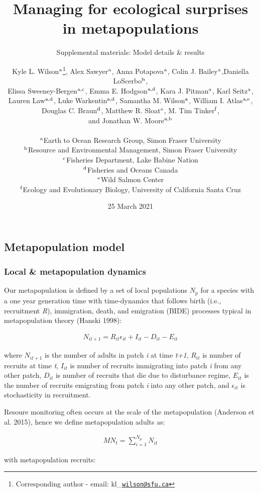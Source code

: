 \documentclass[
]{article}
\title{Managing for ecological surprises in metapopulations}
\subtitle{Supplemental materials: Model details \& results}
\author{Kyle L. Wilson\(^\textup{a}\)\footnote{Corresponding author -
  email: kl\_\href{mailto:wilson@sfu.ca}{\nolinkurl{wilson@sfu.ca}}},
Alex Sawyer\(^\textup{a}\), Anna Potapova\(^\textup{a}\), Colin J.
Bailey\(^\textup{a}\),Daniella LoScerbo\(^\textup{b}\),\\
Elissa Sweeney-Bergen\(^\textup{a,c}\), Emma E.
Hodgson\(^\textup{a,d}\), Kara J. Pitman\(^\textup{a}\), Karl
Seitz\(^\textup{a}\),\\
Lauren Law\(^\textup{a,d}\), Luke Warkentin\(^\textup{a,d}\), Samantha
M. Wilson\(^\textup{a}\), William I. Atlas\(^\textup{a,e}\),\\
Douglas C. Braun\(^\textup{d}\), Matthew R. Sloat\(^\textup{e}\), M. Tim
Tinker\(^\textup{f}\),\\
and Jonathan W. Moore\(^\textup{a,b}\)\\
~\\
\(^\textup{a}\)Earth to Ocean Research Group, Simon Fraser University\\
\(^\textup{b}\)Resource and Environmental Management, Simon Fraser
University\\
\(^\textup{c}\)Fisheries Department, Lake Babine Nation\\
\(^\textup{d}\)Fisheries and Oceans Canada\\
\(^\textup{e}\)Wild Salmon Center\\
\(^\textup{f}\)Ecology and Evolutionary Biology, University of
California Santa Cruz}
\date{25 March 2021}
\begin{document}
\maketitle

\centering
\raggedright
\renewcommand{\baselinestretch}{1}\normalsize
\tableofcontents
\renewcommand{\baselinestretch}{0.75}\normalsize
\newpage

\pagestyle{fancy}

\hypertarget{metapopulation-model}{%
\subsection{Metapopulation model}\label{metapopulation-model}}

\hypertarget{local-metapopulation-dynamics}{%
\subsubsection{Local \& metapopulation
dynamics}\label{local-metapopulation-dynamics}}

Our metapopulation is defined by a set of local populations \(N_p\) for
a species with a one year generation time with time-dynamics that
follows birth (i.e., recruitment \emph{R}), immigration, death, and
emigration (BIDE) processes typical in metapopulation theory (Hanski
1998):

\begin{align}
N_{i{t+1}}= R_{it}\epsilon_{it}+I_{it}-D_{it}-E_{it}
\end{align}

where \(N_{it+1}\) is the number of adults in patch \emph{i} at time
\emph{t+1}, \(R_{it}\) is number of recruits at time \emph{t},
\(I_{it}\) is number of recruits immigrating into patch \emph{i} from
any other patch, \(D_{it}\) is number of recruits that die due to
disturbance regime, \(E_{it}\) is the number of recruits emigrating from
patch \emph{i} into any other patch, and \(\epsilon_{it}\) is
stochasticity in recruitment.

Resoure monitoring often occurs at the scale of the metapopulation
(Anderson et al. 2015), hence we define metapopulation adults as:

\begin{align}
{MN}_t = \sum_{i=1}^{N_p} N_{it}
\end{align}

with metapopulation recruits:
\end{document}
